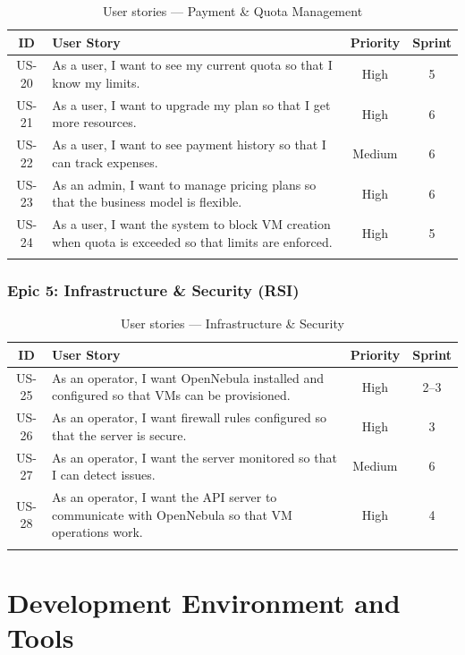 \begin{longtable}{|c|p{7cm}|c|c|}
\hline
\rowcolor{blue!15}
\textbf{ID} & \textbf{User Story} & \textbf{Priority} & \textbf{Sprint} \\
\hline
\endhead
US-20 & As a user, I want to see my current quota so that I know my limits. & High & 5 \\
\hline
US-21 & As a user, I want to upgrade my plan so that I get more resources. & High & 6 \\
\hline
US-22 & As a user, I want to see payment history so that I can track expenses. & Medium & 6 \\
\hline
US-23 & As an admin, I want to manage pricing plans so that the business model is flexible. & High & 6 \\
\hline
US-24 & As a user, I want the system to block VM creation when quota is exceeded so that limits are enforced. & High & 5 \\
\hline
\caption{User stories — Payment \& Quota Management}
\label{tab:us-payment}
\end{longtable}

\subsubsection{Epic 5: Infrastructure \& Security (RSI)}

\begin{longtable}{|c|p{7cm}|c|c|}
\hline
\rowcolor{blue!15}
\textbf{ID} & \textbf{User Story} & \textbf{Priority} & \textbf{Sprint} \\
\hline
\endhead
US-25 & As an operator, I want OpenNebula installed and configured so that VMs can be provisioned. & High & 2--3 \\
\hline
US-26 & As an operator, I want firewall rules configured so that the server is secure. & High & 3 \\
\hline
US-27 & As an operator, I want the server monitored so that I can detect issues. & Medium & 6 \\
\hline
US-28 & As an operator, I want the API server to communicate with OpenNebula so that VM operations work. & High & 4 \\
\hline
\caption{User stories — Infrastructure \& Security}
\label{tab:us-infra}
\end{longtable}

\section{Development Environment and Tools}

